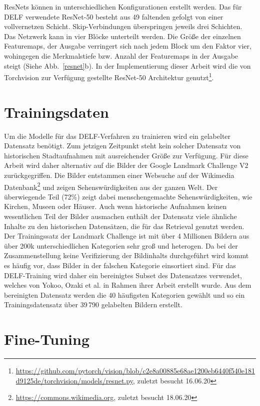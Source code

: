 ResNets können in unterschiedlichen Konfigurationen erstellt werden. Das für DELF verwendete \mbox{ResNet-50} besteht aus 49 faltenden gefolgt von einer vollvernetzen Schicht. Skip-Verbindungen überspringen jeweils drei Schichten. Das Netzwerk kann in vier Blöcke unterteilt werden. Die Größe der einzelnen Featuremaps, der Ausgabe verringert sich nach jedem Block um den Faktor vier, wohingegen die Merkmalstiefe bzw. Anzahl der Featuremaps in der Ausgabe steigt (Siehe Abb.~\ref{resnet}b). In der Implementierung dieser Arbeit wird die von Torchvision zur Verfügung gestellte ResNet-50 Architektur genutzt\footnote{\url{https://github.com/pytorch/vision/blob/c2e8a00885e68ae1200eb6440f540e181d9125de/torchvision/models/resnet.py}, zuletzt besucht 16.06.20}. 


\section{Trainingsdaten}\label{trainingsdata}
Um die Modelle für das DELF-Verfahren zu trainieren wird ein gelabelter Datensatz benötigt. Zum jetzigen Zeitpunkt steht kein solcher Datensatz von historischen Stadtaufnahmen mit ausreichender Größe zur Verfügung. Für diese Arbeit wird daher alternativ auf die Bilder der Google Landmark Challenge V2 \cite{landmarks_v2} zurückgegriffen. Die Bilder entstammen einer Websuche auf der Wikimedia Datenbank\footnote{\url{https://commons.wikimedia.org}, zuletzt besucht 18.06.20} und zeigen Sehenswürdigkeiten aus der ganzen Welt. Der überwiegende Teil (72\%) zeigt dabei menschengemachte Sehenswürdigkeiten, wie Kirchen, Museen oder Häuser. Auch wenn historische Aufnahmen keinen wesentlichen Teil der Bilder ausmachen enthält der Datensatz viele ähnliche Inhalte zu den historischen Datensätzen, die für das Retrieval genutzt werden. Der Trainingssatz der Landmark Challenge ist mit über 4 Millionen Bildern aus über 200k unterschiedlichen Kategorien sehr groß und heterogen. Da bei der Zusammenstellung keine Verifizierung der Bildinhalts durchgeführt wird kommt es häufig vor, dass Bilder in der falschen Kategorie einsortiert sind. Für das DELF-Training wird daher ein bereinigtes Subset des Datensatzes verwendet, welches von Yokoo, Ozaki et al. in Rahmen ihrer Arbeit \cite{landmarks_verified} erstellt wurde. Aus dem bereinigten Datensatz werden die 40 häufigsten Kategorien gewählt und so ein Trainingsdatensatz über 39\,790 gelabelten Bildern erstellt. 

\section{Fine-Tuning}

